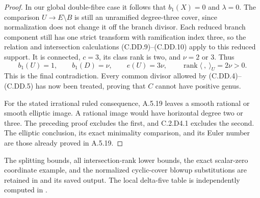 \begin{proof}
In our global double-fibre case it follows that
$b_1(X)=0$ and $\lambda=0$.
The comparison $U\to E\setminus B$ is still an
unramified degree-three cover, since normalization
does not change it off the branch divisor.
Each reduced branch component still has one
strict transform with ramification index three,
so the relation and intersection calculations
(C.DD.9)--(C.DD.10) apply to this reduced support.
It is connected, $c=3$, its class rank is two,
and $\nu=2$ or $3$. Thus
\[
 b_1(U)=1,\qquad b_1(D)=\nu,\qquad e(U)=3\nu,
 \qquad\operatorname{rank}\langle\ ,\ \rangle_U
                                      =2\nu>0.
\tag{C.DD.21}
\]
This is the final contradiction. Every common
divisor allowed by (C.DD.4)--(C.DD.5) has now
been treated, proving that $C$ cannot have
positive genus.

For the stated irrational ruled consequence,
A.5.19 leaves a smooth rational or smooth elliptic
image. A rational image would have horizontal
degree two or three. The preceding proof excludes
the first, and C.2.D4.1 excludes the second.
The elliptic conclusion, its exact minimality
comparison, and its Euler number are those already
proved in A.5.19.
\end{proof}

The splitting bounds, all intersection-rank lower
bounds, the exact scalar-zero coordinate example,
and the normalized cyclic-cover blowup substitutions
are retained in  and
its saved output. The local delta-five table is
independently computed in .
